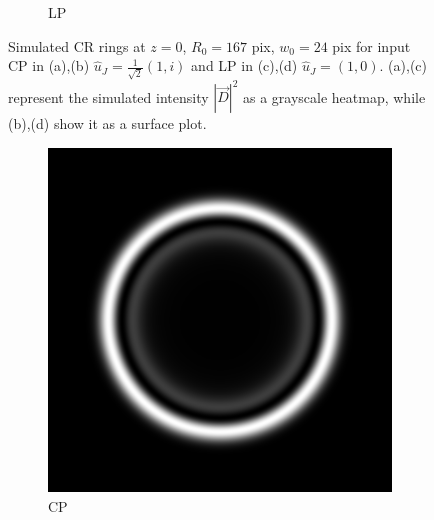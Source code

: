 \documentclass[11pt, a4paper, twoside]{article} %
\begin{document}
\begin{figure}[h!]
\begin{subfigure}[b]{0.25\linewidth}
     \caption{LP }
     \end{subfigure}
    \caption{Simulated CR rings at $z=0$, $R_0=167$ pix, $w_0=24$ pix for input CP in (a),(b) $\hat{u}_J=\frac{1}{\sqrt{2}}(1,i)$ and LP in (c),(d) $\hat{u}_J=(1,0)$. (a),(c) represent the simulated intensity $|\vec{D}|^2$ as a grayscale heatmap, while (b),(d) show it as a surface plot.}
        \label{fig:simul1}
\end{figure}

\begin{figure}[h!] 
     \centering 
    \begin{subfigure}[b]{0.245\linewidth}
    \includegraphics[width=\linewidth]{simul21.png}
    \caption{CP }
     \end{subfigure}
 \begin{subfigure}[b]{0.245\linewidth}

\end{subfigure}
\end{figure}
\end{document}
